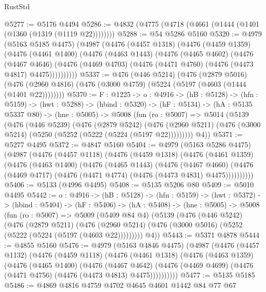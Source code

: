 \begin{lexlean}{RustStd}
\begin{coremodule}
@5277 := @5176 @4494
@5286 := @4832 (@4775 (@4718 (@4661 (@1444 (@1401 (@1360 (@1319 (@1119 @22))))))))
@5288 := @54 @5286 @5160
@5320 := @4979
    (@5163 @5185 @4475)
    (@4987
      (@4476
        (@4457 @1318)
        (@4476
          (@4459 @1359)
          (@4476
            (@4461 @1400)
            (@4476
              (@4463 @1443)
              (@4476
                (@4465 @4602)
                (@4476
                  (@4467 @4646)
                  (@4476 (@4469 @4703) (@4476 (@4471 @4760) (@4476 (@4473 @4817) @4475))))))))))
@5337 := @476
    (@446 @5214)
    (@476
      (@2879 @5016)
      (@476 (@2960 @4816) (@476 (@3000 @4759) (@5224 (@5197 (@4603 (@1444 (@1401 @22))))))))
@5370 := {F : @1225} ->
  {o : @4916} ->
  (hB : @5128) ->
  (hfn : @5159) ->
  (hwt : @5288) ->
  (hbind : @5320) ->
  (hF : @5134) ->
  (hA : @5135 @5337 @80) ->
  (hne : @5005) ->
  @5008
    (fun (ro : @5007) =>
    @5014
      (@5139
        (@476
          (@446 @5239)
          (@476
            (@2879 @5242)
            (@476 (@2960 @5211) (@476 (@3000 @5214) (@5250 (@5252 (@5222 (@5224 (@5197 @22)))))))))
        @4))
@5371 := @5277 @4495
@5372 := @4847 @5160
@5404 := @4979
    (@5163 @5286 @4475)
    (@4987
      (@4476
        (@4457 @1118)
        (@4476
          (@4459 @1318)
          (@4476
            (@4461 @1359)
            (@4476
              (@4463 @1400)
              (@4476
                (@4465 @1443)
                (@4476
                  (@4467 @4660)
                  (@4476 (@4469 @4717) (@4476 (@4471 @4774) (@4476 (@4473 @4831) @4475))))))))))
@5406 := @5133 (@4996 @4495)
@5408 := @5135 @5206 @80
@5409 := @5010 @4495
@5442 := {o : @4916} ->
  (hB : @5128) ->
  (hfn : @5159) ->
  (hwt : @5372) ->
  (hbind : @5404) ->
  (hF : @5406) ->
  (hA : @5408) ->
  (hne : @5005) ->
  @5008
    (fun (ro : @5007) =>
    @5009
      (@5409 @84 @4)
      (@5139
        (@476
          (@446 @5242)
          (@476
            (@2879 @5211)
            (@476 (@2960 @5214) (@476 (@3000 @5016) (@5252 (@5222 (@5224 (@5197 (@4603 @22)))))))))
        @4))
@5443 := @5371 @4878
@5444 := @4855 @5160
@5476 := @4979
    (@5163 @4846 @4475)
    (@4987
      (@4476
        (@4457 @1132)
        (@4476
          (@4459 @1118)
          (@4476
            (@4461 @1318)
            (@4476
              (@4463 @1359)
              (@4476
                (@4465 @1400)
                (@4476
                  (@4467 @4642)
                  (@4476 (@4469 @4699) (@4476 (@4471 @4756) (@4476 (@4473 @4813) @4475))))))))))
@5477 := @5135 @5185
@5486 := @4869 @4816 @4759 @4702 @4645 @4601 @1442 @84 @77 @67

\end{coremodule}
\end{lexlean}
